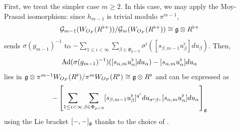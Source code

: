 \documentclass[12pt,reqno]{amsart}
\begin{document}
First, we treat the simpler case $m \geq 2$. In this case, we may apply the Moy-Prasad isomorphism: since $h_{m-1}$ is trivial modulo $\pi^{m-1}$, %
\[
    {\mathcal{G}}_{m-1}(W_{O_F}(R^{\flat+}))/{\mathcal{G}}_{m}(W_{O_F}(R^{\flat+})) \cong {\mathfrak{g}} \otimes R^{\flat +}
\]
sends $\sigma(g_{m-1})^{-1}$ to $- \sum_{1\leq i < \infty} \sum_{\beta \in \Phi_{\mu<0}} \sigma^i([s_{\beta,m-1}u_\beta^\flat] du_\beta)$. 
Then, 
\[
    {\operatorname{Ad}}(\sigma(g_{m-1})^{-1})([s_{\alpha,m}u_\alpha^\flat]du_\alpha) - [s_{\alpha,m}u_\alpha^\flat]du_\alpha
\]
lies in ${\mathfrak{g}} \otimes \pi^{m-1} W_{O_F}(R^\flat)/\pi^{m} W_{O_F}(R^\flat) \cong {\mathfrak{g}} \otimes R^{\flat}$ and can be expressed as
\begin{equation}\label{eq:breven}
    - \left[\sum_{1\leq i < \infty} \sum_{\beta \in \Phi_{\mu<0}} [s_{\beta,m-1}u_\beta^\flat]^{q^i} du_{\sigma^i\beta}, [s_{\alpha,m}u_\alpha^\flat]du_\alpha \right]_{{\mathfrak{g}}} 
\end{equation}
using the Lie bracket $[-,-]_{{\mathfrak{g}}}$ thanks to the choice of . 
\end{document}
